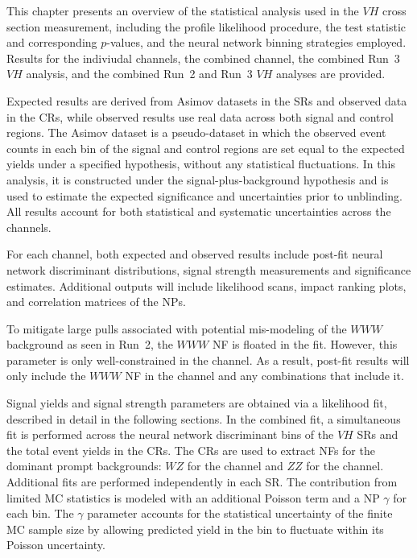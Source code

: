 This chapter presents an overview of the statistical analysis used in the $VH$ cross section measurement, including the profile likelihood procedure, the test statistic and corresponding $p$-values, and the neural network binning strategies employed. Results for the indiviudal \wh{} channels, the combined \wh{} channel, the combined Run~3 $VH$ analysis, and the combined Run~2 and Run~3 $VH$ analyses are provided.

Expected results are derived from Asimov datasets in the SRs and observed data in the CRs, while observed results use real data across both signal and control regions. The Asimov dataset is a pseudo-dataset in which the observed event counts in each bin of the signal and control regions are set equal to the expected yields under a specified hypothesis, without any statistical fluctuations. In this analysis, it is constructed under the signal-plus-background hypothesis and is used to estimate the expected significance and uncertainties prior to unblinding. All results account for both statistical and systematic uncertainties across the channels.

For each channel, both expected and observed results include post-fit neural network discriminant distributions, signal strength measurements and significance estimates. Additional outputs will include likelihood scans, impact ranking plots, and correlation matrices of the NPs.

To mitigate large pulls associated with potential mis-modeling of the $WWW$ background as seen in Run~2, the $WWW$ NF is floated in the fit. However, this parameter is only well-constrained in the \zdep{} channel. As a result, post-fit results will only include the $WWW$ NF in the \zdep{} channel and any combinations that include it.

Signal yields and signal strength parameters are obtained via a likelihood fit, described in detail in the following sections. In the combined fit, a simultaneous fit is performed across the neural network discriminant bins of the $VH$ SRs and the total event yields in the CRs. The CRs are used to extract NFs for the dominant prompt backgrounds: $WZ$ for the \wh{} channel and $ZZ$ for the \zh{} channel. Additional fits are performed independently in each SR. The contribution from limited MC statistics is modeled with an additional Poisson term and a NP $\gamma$ for each bin. The $\gamma$ parameter accounts for the statistical uncertainty of the finite MC sample size by allowing predicted yield in the bin to fluctuate within its Poisson uncertainty.